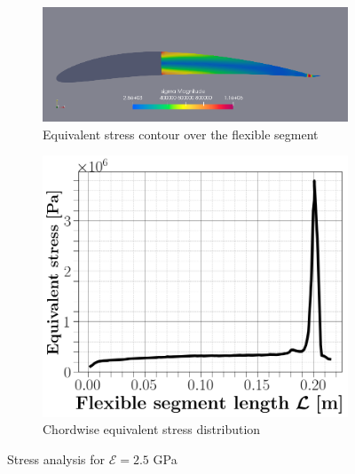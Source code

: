 %
\begin{figure}[ht!]
\centering
\begin{subfigure}{.4\textwidth}
\includegraphics[width=0.99\columnwidth]{Figures/sigma.png}
\caption{\label{fig:stress} Equivalent stress contour over the flexible segment}
\end{subfigure}
\begin{subfigure}{.3\textwidth}
\includegraphics[width=0.99\columnwidth]{figs/equivalentstress.png}
\caption{Chordwise equivalent stress distribution\label{fig:stress2.5GPa}}
\end{subfigure}
\caption{\label{fig:displ} Stress analysis for $\mathcal{E}= 2.5$ GPa }
\end{figure}
